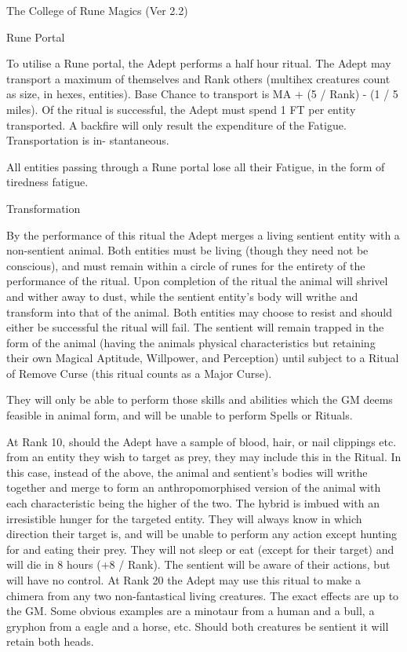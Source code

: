 \begin{Chapter}{The College of Rune Magics (Ver 2.2)}
\begin{ritual}[R-6]{Rune Portal}
\begin{effects}
To utilise a Rune portal, the Adept performs a half hour ritual.  The
Adept may transport a maximum of themselves and Rank others (multihex
creatures count as size, in hexes, entities).  Base Chance to
transport is MA + (5 / Rank) - (1 / 5 miles). Of the ritual is
successful, the Adept must spend 1 FT per entity transported.  A
backfire will only result the expenditure of the Fatigue.
Transportation is in- stantaneous.

All entities passing through a Rune portal lose all their Fatigue, in
the form of tiredness fatigue.
\end{effects}
\end{ritual}

\begin{ritual}[R-7]{Transformation}

\begin{effects}
By the performance of this ritual the Adept merges a living sentient
entity with a non-sentient animal.  Both entities must be living
(though they need not be conscious), and must remain within a circle
of runes for the entirety of the performance of the ritual.  Upon
completion of the ritual the animal will shrivel and wither away to
dust, while the sentient entity’s body will writhe and transform into
that of the animal. Both entities may choose to resist and should
either be successful the ritual will fail. The sentient will remain
trapped in the form of the animal (having the animals physical
characteristics but retaining their own Magical Aptitude, Willpower,
and Perception) until subject to a Ritual of Remove Curse (this ritual
counts as a Major Curse).

They will only be able to perform those skills and abilities which the
GM deems feasible in animal form, and will be unable to perform Spells
or Rituals.

At Rank 10, should the Adept have a sample of blood, hair, or nail
clippings etc.  from an entity they wish to target as prey, they may
include this in the Ritual.  In this case, instead of the above, the
animal and sentient’s bodies will writhe together and merge to form an
anthropomorphised version of the animal with each characteristic being
the higher of the two.  The hybrid is imbued with an irresistible
hunger for the targeted entity.  They will always know in which
direction their target is, and will be unable to perform any action
except hunting for and eating their prey. They will not sleep or eat
(except for their target) and will die in 8 hours (+8 / Rank).  The
sentient will be aware of their actions, but will have no control.  At
Rank 20 the Adept may use this ritual to make a chimera from any two
non-fantastical living creatures. The exact effects are up to the GM.
Some obvious examples are a minotaur from a human and a bull, a
gryphon from a eagle and a horse, etc.  Should both creatures be
sentient it will retain both heads.
\end{effects}
\end{ritual}

\end{Chapter}
